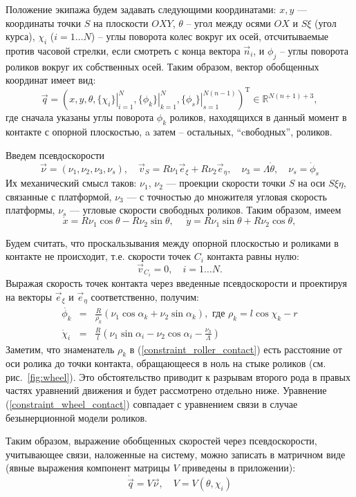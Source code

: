 Положение экипажа будем задавать следующими координатами:
$x, y$ --- координаты точки $S$ на плоскости $OXY$, $\theta$ -- угол между осями $OX$ и $S\xi$ (угол курса),
$\chi_i$ ($i = 1\dots N$) -- углы поворота колес вокруг их осей, отсчитываемые против часовой стрелки, если смотреть с конца вектора $\vec{n}_i$, и $\phi_j$ -- углы поворота роликов вокруг их собственных осей.
Таким образом, вектор обобщенных координат имеет вид:
$$\vec{q} = (
    x, y, \theta,
    \left.\{\chi_i\}\right|_{i=1}^N ,
    \left.\{\phi_k\}\right|_{k=1}^N,
    \left.\{\phi_s\}\right|_{s=1}^{N(n - 1)}
)^{\mathop{T}}\in\mathbb{R}^{N(n+1) + 3},$$ 
где сначала указаны углы поворота $\phi_k$ роликов, находящихся в данный момент в контакте с опорной плоскостью, a затем -- остальных, ``cвободных'', роликов.

Введем псевдоскорости
$$\vec{\nu} = (\nu_1, \nu_2, \nu_3, \nu_s), \quad \vec{v}_S = R\nu_1\vec{e}_\xi + R\nu_2\vec{e}_\eta, \quad \nu_3 = \Lambda\dot{\theta},\quad \nu_s = \dot{\phi}_s$$
Их механический смысл таков: $\nu_1$, $\nu_2$ --- проекции скорости точки $S$ на оси $S\xi\eta$, связанные с платформой, $\nu_3$ --- с точностью до множителя угловая скорость платформы, $\nu_s$ --- угловые скорости свободных роликов. Таким образом, имеем
$$ \dot{x} = R \nu_1\cos\theta-R\nu_2\sin\theta, \hspace{15pt} \dot{y} = R\nu_1\sin\theta+R\nu_2\cos\theta,$$

Будем считать, что проскальзывания между опорной плоскостью и роликами в контакте не происходит, т.е.
скорости точек $C_i$ контакта равны нулю:
$$\vec{v}_{C_i} = 0,\quad i = 1\dots N.$$
Выражая скорость точек контакта через введенные псевдоскорости и проектируя на векторы $\vec{e}_\xi$ и $\vec{e}_\eta$ соответственно, получим:
\begin{eqnarray}
\dot{\phi_k} &=& \frac{R}{\rho_k }(\nu_1\cos\alpha_k + \nu_2\sin\alpha_k),\text{ где } \rho_k  = l\cos\chi_k - r \label{constraint_roller_contact}\\
\dot{\chi}_i &=& \frac{R}{l}(\nu_1\sin\alpha_i - \nu_2\cos\alpha_i - \frac{\nu_3}{\Lambda})\label{constraint_wheel_contact}
\end{eqnarray}
Заметим, что знаменатель $\rho_k$ в (\ref{constraint_roller_contact}) есть расстояние от оси ролика до точки контакта, обращающееся в ноль на стыке роликов (см. рис.~\ref{fig:wheel}). Это обстоятельство приводит к разрывам второго рода в правых частях уравнений движения и будет рассмотрено отдельно ниже.
Уравнение (\ref{constraint_wheel_contact}) совпадает с уравнением связи в случае безынерционной модели роликов. 

Таким образом, выражение обобщенных скоростей через псевдоскорости, учитывающее связи, наложенные на систему, можно записать в матричном виде (явные выражения компонент матрицы $V$ приведены в приложении):
\begin{equation}
    \dot{\vec{q}} = V\vec{\nu},\quad V = V(\theta,\chi_i)
\end{equation}
